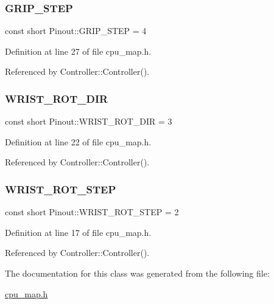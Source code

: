 \mbox{\label{class_pinout_a034e6fd901a557f17809260288ea4740}} 
\subsubsection{\texorpdfstring{G\+R\+I\+P\+\_\+\+S\+T\+EP}{GRIP\_STEP}}
{\footnotesize\ttfamily const short Pinout\+::\+G\+R\+I\+P\+\_\+\+S\+T\+EP = 4\hspace{0.3cm}{\ttfamily [static]}}



Definition at line 27 of file cpu\+\_\+map.\+h.



Referenced by Controller\+::\+Controller().

\mbox{\label{class_pinout_a2bdfc2d0feb1763149886acaab1a0419}} 
\subsubsection{\texorpdfstring{W\+R\+I\+S\+T\+\_\+\+R\+O\+T\+\_\+\+D\+IR}{WRIST\_ROT\_DIR}}
{\footnotesize\ttfamily const short Pinout\+::\+W\+R\+I\+S\+T\+\_\+\+R\+O\+T\+\_\+\+D\+IR = 3\hspace{0.3cm}{\ttfamily [static]}}



Definition at line 22 of file cpu\+\_\+map.\+h.



Referenced by Controller\+::\+Controller().

\mbox{\label{class_pinout_a5f15f2424dc98ebf66f74063798ae28e}} 
\subsubsection{\texorpdfstring{W\+R\+I\+S\+T\+\_\+\+R\+O\+T\+\_\+\+S\+T\+EP}{WRIST\_ROT\_STEP}}
{\footnotesize\ttfamily const short Pinout\+::\+W\+R\+I\+S\+T\+\_\+\+R\+O\+T\+\_\+\+S\+T\+EP = 2\hspace{0.3cm}{\ttfamily [static]}}



Definition at line 17 of file cpu\+\_\+map.\+h.



Referenced by Controller\+::\+Controller().



The documentation for this class was generated from the following file\+:\begin{DoxyCompactItemize}
\item 
\hyperlink{cpu__map_8h}{cpu\+\_\+map.\+h}\end{DoxyCompactItemize}

